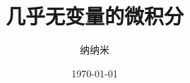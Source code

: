 \title{几乎无变量的微积分}
\author{纳纳米}
\date{\today}

\providecommand*{\thesubtitle}{%
    \pageref{calculus:LastPage}~分快速上手}

\providecommand*{\theversion}{2π}
